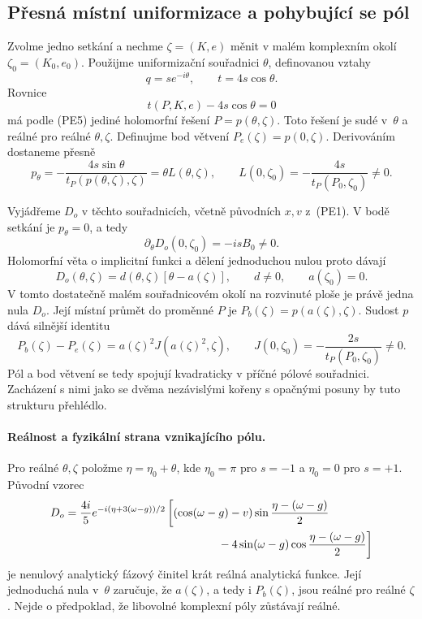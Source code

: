 \documentclass[11pt,a4paper]{article}
\theoremstyle{remark}\newtheorem{remark}[theorem]{Poznámka}
\numberwithin{equation}{section}
\begin{document}
\subsection{Přesná místní uniformizace a pohybující se pól}

Zvolme jedno setkání a nechme \(\zeta=(K,e)\) měnit v malém
komplexním okolí \(\zeta_0=(K_0,e_0)\). Použijme
uniformizační souřadnici \(\theta\), definovanou vztahy
\[
q=s e^{-i\theta},\qquad t=4s\cos\theta.
\tag{PE8}
\]
Rovnice
\[
t(P,K,e)-4s\cos\theta=0
\]
má podle (PE5) jediné holomorfní řešení
\(P=p(\theta,\zeta)\). Toto řešení je sudé v~\(\theta\)
a reálné pro reálné \(\theta,\zeta\). Definujme bod větvení
\(P_e(\zeta)=p(0,\zeta)\). Derivováním dostaneme přesně
\[
p_\theta=-\frac{4s\sin\theta}
{t_P(p(\theta,\zeta),\zeta)}
=\theta L(\theta,\zeta),\qquad
L(0,\zeta_0)=-\frac{4s}{t_P(P_0,\zeta_0)}\ne0.
\tag{PE9}
\]

Vyjádřeme \(D_o\) v těchto souřadnicích, včetně původních
\(x,v\) z~(PE1). V bodě setkání je \(p_\theta=0\), a tedy
\[
\partial_\theta D_o(0,\zeta_0)=-isB_0\ne0.
\tag{PE10}
\]
Holomorfní věta o implicitní funkci a dělení jednoduchou nulou
proto dávají
\[
\boxed{
D_o(\theta,\zeta)=d(\theta,\zeta)
[\theta-a(\zeta)],\qquad
d\ne0,\qquad a(\zeta_0)=0.
}
\tag{PE11}
\]
V tomto dostatečně malém souřadnicovém okolí na rozvinuté ploše
je právě jedna nula \(D_o\). Její místní průmět do proměnné
\(P\) je \(P_b(\zeta)=p(a(\zeta),\zeta)\). Sudost
\(p\) dává silnější identitu
\[
\boxed{
P_b(\zeta)-P_e(\zeta)
=a(\zeta)^2J(a(\zeta)^2,\zeta),\qquad
J(0,\zeta_0)=-\frac{2s}{t_P(P_0,\zeta_0)}\ne0.
}
\tag{PE12}
\]
Pól a bod větvení se tedy spojují kvadraticky v příčné pólové
souřadnici. Zacházení s nimi jako se dvěma nezávislými kořeny
s opačnými posuny by tuto strukturu přehlédlo.

\paragraph{Reálnost a fyzikální strana vznikajícího pólu.}

Pro reálné \(\theta,\zeta\) položme
\(\eta=\eta_0+\theta\), kde \(\eta_0=\pi\) pro
\(s=-1\) a \(\eta_0=0\) pro \(s=+1\). Původní vzorec
\[
\begin{aligned}
D_o={}&\frac{4i}{5}e^{-i(\eta+3(\omega-g))/2}\,
\bigg[
(\cos(\omega-g)-v)
\sin\frac{\eta-(\omega-g)}2\\
&\hspace{43mm}
-4\sin(\omega-g)\cos\frac{\eta-(\omega-g)}2
\bigg]
\end{aligned}
\]
je nenulový analytický fázový činitel krát reálná analytická
funkce. Její jednoduchá nula v~\(\theta\) zaručuje, že
\(a(\zeta)\), a tedy i \(P_b(\zeta)\), jsou reálné pro
reálné \(\zeta\). Nejde o předpoklad, že libovolné komplexní
póly zůstávají reálné.
\end{document}
